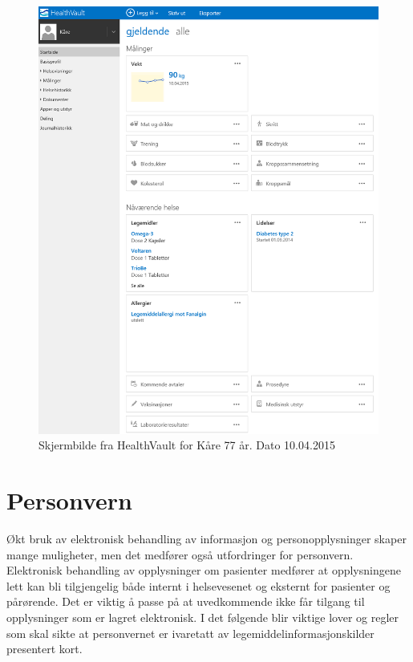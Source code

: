 \begin{figure}[H]
  \centering
    \includegraphics[width=1\textwidth]{fig/dagens/HealthVault.png}
  \caption{Skjermbilde fra HealthVault for Kåre 77 år. Dato 10.04.2015}
\label{fig:HealthVault}
\end{figure}


\section{Personvern} \label{sec:sikkerhet}
Økt bruk av elektronisk behandling av informasjon og personopplysninger skaper mange muligheter, men det medfører også utfordringer for personvern. Elektronisk behandling av opplysninger om pasienter medfører at opplysningene lett kan bli tilgjengelig både internt i helsevesenet og eksternt for pasienter og pårørende. Det er viktig å passe på at uvedkommende ikke får tilgang til opplysninger som er lagret elektronisk. I det følgende blir viktige lover og regler som skal sikte at personvernet er ivaretatt av legemiddelinformasjonskilder presentert kort.


